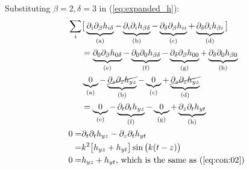 \documentclass[]{article}
\begin{document}
Substituting $\beta=2,\delta=3$ in (\ref{eq:expanded_h}):
\begin{align*}
	\sum_i&\big[\underbrace{\partial_i\partial_\beta h_{i\delta}}_\text{(a)} - \underbrace{\partial_i\partial_i h_{\beta\delta}}_\text{(b)} -  \underbrace{\partial_\delta\partial_\beta h_{ii}}_\text{(c)} + \underbrace{\partial_\delta\partial_i h_{\beta i}}_\text{(d)}\big]\\
	&=\underbrace{\partial_0\partial_\beta h_{0\delta}}_\text{(e)} - \underbrace{\partial_0\partial_0 h_{\beta\delta}}_\text{(f)} -  \underbrace{\partial_\delta\partial_\beta h_{00}}_\text{(g)} + \underbrace{\partial_\delta\partial_0 h_{\beta 0}}_\text{(h)}\\
	&\underbrace{0}_\text{(a)} - \underbrace{\cancel{\partial_z\partial_z h_{yz}}}_\text{(b)} -  \underbrace{0}_\text{(c)} + \underbrace{\cancel{\partial_z\partial_z h_{yz}}}_\text{(d)}\\
	&=\underbrace{0}_\text{(e)} - \underbrace{\partial_t\partial_t h_{yz}}_\text{(f)} -  \underbrace{0}_\text{(g)} + \underbrace{\partial_z\partial_t h_{yt}}_\text{(h)}\\
	0=&\partial_t\partial_t h_{yz}-\partial_z\partial_t h_{yt}\\
	=&k^2 \big[ h_{yz}+h_{yt}\big] \sin\big(k(t-z)\big) \\
	0=&  h_{yz}+h_{yt} \text{, which is the same as (\ref{eq:con:02})}
\end{align*}
\end{document}
